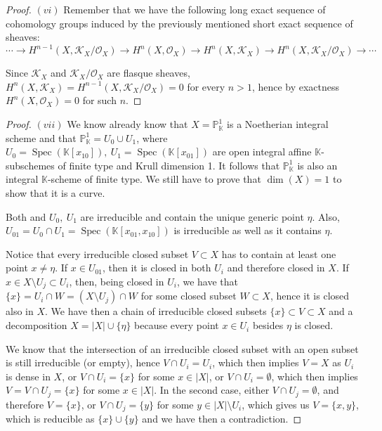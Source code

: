 \documentclass{article}
\newcommand{\numberset}{\mathbb}
\newcommand{\K}{\numberset{K}}
\newcommand{\Ps}{\mathbb{P}}
\DeclareMathOperator{\Spec}{Spec}
\begin{document}
\begin{proof}
    $(vi)$ Remember that we have the following long exact sequence of cohomology
    groups induced by the previously mentioned short exact sequence of sheaves:
    $$\cdots\rightarrow H^{n-1}(X,\mathcal{K}_X/\mathcal{O}_X)\rightarrow
    H^n(X,\mathcal{O}_X)\rightarrow H^n(X,\mathcal{K}_X)\rightarrow
    H^n(X,\mathcal{K}_X/\mathcal{O}_X)\rightarrow\cdots$$

    Since $\mathcal{K}_X$ and $\mathcal{K}_X/\mathcal{O}_X$ are flasque sheaves,
    $H^n(X,\mathcal{K}_X)=H^{n-1}(X,\mathcal{K}_X/\mathcal{O}_X)=0$ for every
    $n>1$, hence by exactness $H^n(X,\mathcal{O}_X)=0$ for such $n$.
\end{proof}

\begin{proof}
    $(vii)$ We know already know that $X=\Ps^1_\K$ is a Noetherian integral
    scheme and that $\Ps^1_\K=U_0\cup U_1$, where $U_0=\Spec(\K[x_{10}]),\
    U_1=\Spec(\K[x_{01}])$ are open integral affine $\K$-subschemes of finite
    type and Krull dimension 1. It follows that $\Ps^1_\K$ is also an integral
    $\K$-scheme of finite type. We still have to prove that $\dim(X)=1$
    to show that it is a curve.

    Both and $U_0,\ U_1$ are irreducible and contain the unique generic point
    $\eta$. Also, $U_{01}=U_0\cap U_1=\Spec(\K[x_{01},x_{10}])$ is irreducible as
    well as it contains $\eta$.

    Notice that every irreducible closed subset $V\subset X$ has to contain at
    least one point $x\neq\eta$. If $x\in U_{01}$, then it is closed in both
    $U_i$ and therefore closed in $X$. If $x\in X\setminus U_j\subset U_i$,
    then, being closed in $U_i$, we have that $\{x\}=U_i\cap W=
    (X\setminus U_j)\cap W$ for some closed subset $W\subset X$, hence it is
    closed also in $X$. We have then a chain of irreducible closed subsets
    $\{x\}\subset V\subset X$ and a decomposition $X=|X|\cup\{\eta\}$ because
    every point $x\in U_i$ besides $\eta$ is closed.
    
    We know that the intersection of an irreducible closed subset with an open
    subset is still irreducible (or empty), hence $V\cap U_i=U_i$, which
    then implies $V=X$ as $U_i$ is dense in $X$, or $V\cap U_i=\{x\}$ for
    some $x\in |X|$, or $V\cap U_i=\emptyset$, which then implies
    $V=V\cap U_j=\{x\}$ for some $x\in |X|$. In the second case, either
    $V\cap U_j=\emptyset$, and
    therefore $V=\{x\}$, or $V\cap U_j=\{y\}$ for some $y\in |X|\setminus U_i$,
    which gives us $V=\{x,y\}$, which is reducible as $\{x\}\cup\{y\}$ and
    we have then a contradiction.


\end{proof}
\end{document}
